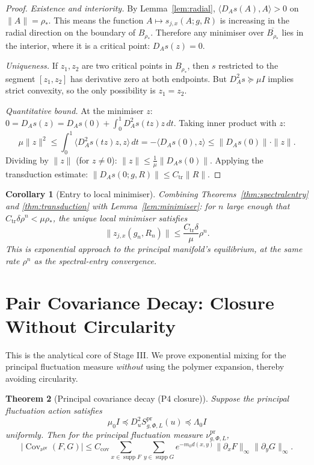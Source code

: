 \documentclass[12pt]{article}
\theoremstyle{plain}
\newtheorem{theorem}{Theorem}[section]
\newtheorem{corollary}[theorem]{Corollary}
\theoremstyle{definition}
\numberwithin{equation}{section}
\newcommand{\Cov}{\operatorname{Cov}}
\newcommand{\supp}{\operatorname{supp}}
\newcommand{\pr}{\mathrm{pr}}
\newcommand{\tr}{\mathrm{tr}}
\begin{document}
\begin{proof}
\emph{Existence and interiority.}
By Lemma~\ref{lem:radial}, $\langle D_A s(A),A\rangle>0$ on $\|A\|=\rho_*$.  This means the function $A\mapsto s_{j,x}(A;g,R)$ is increasing in the radial direction on the boundary of $B_{\rho_*}$.  Therefore any minimiser over $\overline{B_{\rho_*}}$ lies in the interior, where it is a critical point: $D_A s(z)=0$.

\emph{Uniqueness.}
If $z_1,z_2$ are two critical points in $B_{\rho_*}$, then $s$ restricted to the segment $[z_1,z_2]$ has derivative zero at both endpoints.  But $D_A^2 s\succeq\mu I$ implies strict convexity, so the only possibility is $z_1=z_2$.

\emph{Quantitative bound.}
At the minimiser $z$: $0=D_A s(z)=D_A s(0)+\int_0^1 D_A^2 s(tz)z\,dt$.  Taking inner product with $z$:
\begin{equation}
\mu\|z\|^2 \leq \int_0^1\langle D_A^2 s(tz)z,z\rangle\,dt = -\langle D_A s(0),z\rangle \leq \|D_A s(0)\|\cdot\|z\|.
\end{equation}
Dividing by $\|z\|$ (for $z\neq 0$): $\|z\|\leq\frac{1}{\mu}\|D_A s(0)\|$.  Applying the transduction estimate: $\|D_A s(0;g,R)\|\leq C_{\tr}\|R\|$.
\end{proof}

\begin{corollary}[Entry to local minimiser]\label{cor:entry}
Combining Theorems~\ref{thm:spectralentry} and \ref{thm:transduction} with Lemma~\ref{lem:minimiser}: for $n$ large enough that $C_{\tr}\delta\rho^n<\mu\rho_*$, the unique local minimiser satisfies
\begin{equation}
\|z_{j,x}(g_n,R_n)\| \leq \frac{C_{\tr}\delta}{\mu}\rho^n.
\end{equation}
This is \emph{exponential approach to the principal manifold's equilibrium}, at the same rate $\rho^n$ as the spectral-entry convergence.
\end{corollary}

\section{Pair Covariance Decay: Closure Without Circularity}\label{sec:P4}

This is the analytical core of Stage III.  We prove exponential mixing for the principal fluctuation measure \emph{without} using the polymer expansion, thereby avoiding circularity.

\begin{theorem}[Principal covariance decay (P4 closure)]\label{thm:P4}
Suppose the principal fluctuation action satisfies
\begin{equation}
\mu_0 I \preceq D_u^2 S^{\pr}_{g,\Phi,L}(u) \preceq \Lambda_0 I
\end{equation}
uniformly.  Then for the principal fluctuation measure $\nu^{\pr}_{g,\Phi,L}$,
\begin{equation}
\boxed{|\Cov_{\nu^{\pr}}(F,G)| \leq C_{\mathrm{cov}}\sum_{x\in\supp F}\sum_{y\in\supp G}e^{-m_0 d(x,y)}\|\partial_x F\|_\infty\|\partial_y G\|_\infty.}
\end{equation}
\end{theorem}
\end{document}
